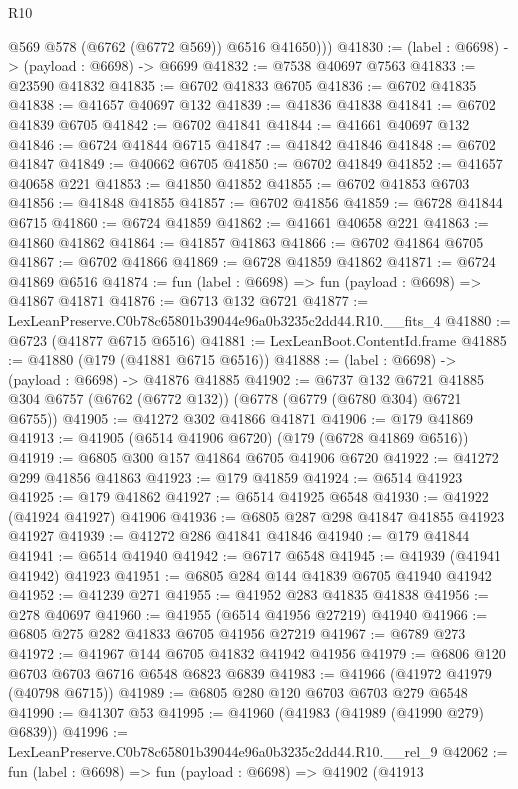 \begin{lexlean}{R10}
\begin{coremodule}
          @569
          @578
          (@6762 (@6772 @569))
          @6516
          @41650)))
@41830 := (label : @6698) -> (payload : @6698) -> @6699
@41832 := @7538 @40697 @7563
@41833 := @23590 @41832
@41835 := @6702 @41833 @6705
@41836 := @6702 @41835
@41838 := @41657 @40697 @132
@41839 := @41836 @41838
@41841 := @6702 @41839 @6705
@41842 := @6702 @41841
@41844 := @41661 @40697 @132
@41846 := @6724 @41844 @6715
@41847 := @41842 @41846
@41848 := @6702 @41847
@41849 := @40662 @6705
@41850 := @6702 @41849
@41852 := @41657 @40658 @221
@41853 := @41850 @41852
@41855 := @6702 @41853 @6703
@41856 := @41848 @41855
@41857 := @6702 @41856
@41859 := @6728 @41844 @6715
@41860 := @6724 @41859
@41862 := @41661 @40658 @221
@41863 := @41860 @41862
@41864 := @41857 @41863
@41866 := @6702 @41864 @6705
@41867 := @6702 @41866
@41869 := @6728 @41859 @41862
@41871 := @6724 @41869 @6516
@41874 := fun (label : @6698) => fun (payload : @6698) => @41867 @41871
@41876 := @6713 @132 @6721
@41877 := LexLeanPreserve.C0b78c65801b39044e96a0b3235c2dd44.R10.__fits_4
@41880 := @6723 (@41877 @6715 @6516)
@41881 := LexLeanBoot.ContentId.frame
@41885 := @41880 (@179 (@41881 @6715 @6516))
@41888 := (label : @6698) -> (payload : @6698) -> @41876 @41885
@41902 := @6737
    @132
    @6721
    @41885
    @304
    @6757
    (@6762 (@6772 @132))
    (@6778 (@6779 (@6780 @304) @6721 @6755))
@41905 := @41272 @302 @41866 @41871
@41906 := @179 @41869
@41913 := @41905 (@6514 @41906 @6720) (@179 (@6728 @41869 @6516))
@41919 := @6805 @300 @157 @41864 @6705 @41906 @6720
@41922 := @41272 @299 @41856 @41863
@41923 := @179 @41859
@41924 := @6514 @41923
@41925 := @179 @41862
@41927 := @6514 @41925 @6548
@41930 := @41922 (@41924 @41927) @41906
@41936 := @6805 @287 @298 @41847 @41855 @41923 @41927
@41939 := @41272 @286 @41841 @41846
@41940 := @179 @41844
@41941 := @6514 @41940
@41942 := @6717 @6548
@41945 := @41939 (@41941 @41942) @41923
@41951 := @6805 @284 @144 @41839 @6705 @41940 @41942
@41952 := @41239 @271
@41955 := @41952 @283 @41835 @41838
@41956 := @278 @40697
@41960 := @41955 (@6514 @41956 @27219) @41940
@41966 := @6805 @275 @282 @41833 @6705 @41956 @27219
@41967 := @6789 @273
@41972 := @41967 @144 @6705 @41832 @41942 @41956
@41979 := @6806 @120 @6703 @6703 @6716 @6548 @6823 @6839
@41983 := @41966 (@41972 @41979 (@40798 @6715))
@41989 := @6805 @280 @120 @6703 @6703 @279 @6548
@41990 := @41307 @53
@41995 := @41960 (@41983 (@41989 (@41990 @279) @6839))
@41996 := LexLeanPreserve.C0b78c65801b39044e96a0b3235c2dd44.R10.__rel_9
@42062 := fun (label : @6698) =>
  fun (payload : @6698) =>
  @41902
    (@41913

\end{coremodule}
\end{lexlean}
